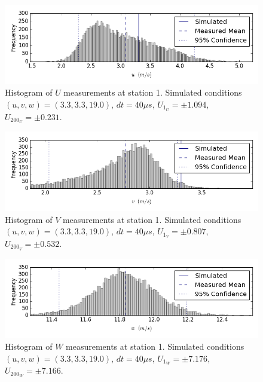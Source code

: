 \begin{figure}[H]
\centering
\includegraphics[width=6in]{figs/Ely_May28th01002/uncertainty_Ely_May28th01002_U}
\caption{Histogram of $U$ measurements at station 1. Simulated conditions 
$(u,v,w)=(3.3, 3.3, 19.0)$, $dt=40 \mu s$, $U_{1_{U}}=\pm 1.094$, 
$U_{200_{U}}=\pm 0.231$.}
\label{fig:uncertainty_Ely_May28th01002_U}
\end{figure}


\begin{figure}[H]
\centering
\includegraphics[width=6in]{figs/Ely_May28th01002/uncertainty_Ely_May28th01002_V}
\caption{Histogram of $V$ measurements at station 1. Simulated conditions 
$(u,v,w)=(3.3, 3.3, 19.0)$, $dt=40 \mu s$, $U_{1_{V}}=\pm 0.807$, 
$U_{200_{V}}=\pm 0.532$.}
\label{fig:uncertainty_Ely_May28th01002_V}
\end{figure}


\begin{figure}[H]
\centering
\includegraphics[width=6in]{figs/Ely_May28th01002/uncertainty_Ely_May28th01002_W}
\caption{Histogram of $W$ measurements at station 1. Simulated conditions 
$(u,v,w)=(3.3, 3.3, 19.0)$, $dt=40 \mu s$, $U_{1_{W}}=\pm 7.176$, 
$U_{200_{W}}=\pm 7.166$.}
\label{fig:uncertainty_Ely_May28th01002_W}
\end{figure}


